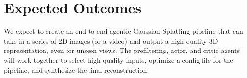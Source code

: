 \section{Expected Outcomes}
\label{sec:expected_outcomes}

We expect to create an end-to-end agentic Gaussian Splatting pipeline that can take in a series of 2D images (or a video) and output a high quality 3D representation, even for unseen views. The prefiltering, actor, and critic agents will work together to select high quality inputs, optimize a config file for the pipeline, and synthesize the final reconstruction.